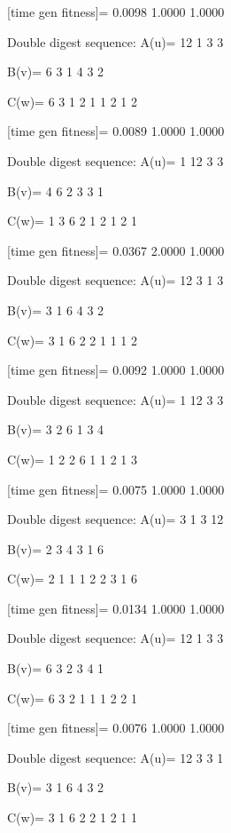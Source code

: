 [time gen fitness]=
    0.0098    1.0000    1.0000

Double digest sequence:
A(u)=
    12     1     3     3

B(v)=
     6     3     1     4     3     2

C(w)=
     6     3     1     2     1     1     2     1     2

[time gen fitness]=
    0.0089    1.0000    1.0000

Double digest sequence:
A(u)=
     1    12     3     3

B(v)=
     4     6     2     3     3     1

C(w)=
     1     3     6     2     1     2     1     2     1

[time gen fitness]=
    0.0367    2.0000    1.0000

Double digest sequence:
A(u)=
    12     3     1     3

B(v)=
     3     1     6     4     3     2

C(w)=
     3     1     6     2     2     1     1     1     2

[time gen fitness]=
    0.0092    1.0000    1.0000

Double digest sequence:
A(u)=
     1    12     3     3

B(v)=
     3     2     6     1     3     4

C(w)=
     1     2     2     6     1     1     2     1     3

[time gen fitness]=
    0.0075    1.0000    1.0000

Double digest sequence:
A(u)=
     3     1     3    12

B(v)=
     2     3     4     3     1     6

C(w)=
     2     1     1     1     2     2     3     1     6

[time gen fitness]=
    0.0134    1.0000    1.0000

Double digest sequence:
A(u)=
    12     1     3     3

B(v)=
     6     3     2     3     4     1

C(w)=
     6     3     2     1     1     1     2     2     1

[time gen fitness]=
    0.0076    1.0000    1.0000

Double digest sequence:
A(u)=
    12     3     3     1

B(v)=
     3     1     6     4     3     2

C(w)=
     3     1     6     2     2     1     2     1     1

